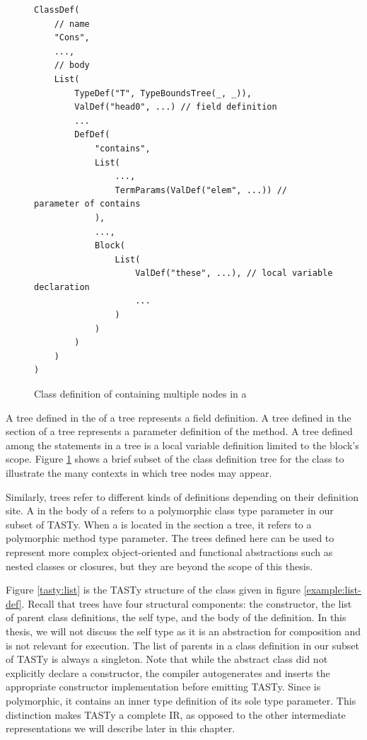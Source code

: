 \begin{figure}[!htb]
\begin{verbatim}
ClassDef(
	// name 
	"Cons",
	...,
	// body
	List(
		TypeDef("T", TypeBoundsTree(_, _)),
		ValDef("head0", ...) // field definition
		...
		DefDef(
			"contains",
			List(
				...,
				TermParams(ValDef("elem", ...)) // parameter of contains
			),
			...,
			Block(
				List(
					ValDef("these", ...), // local variable declaration		
					...
				)
			)
		)
	)
)
\end{verbatim} 
\caption{Class definition of  containing multiple  nodes in a }
\label{example:many-valdefs}
\end{figure}

A  tree defined in the  of a  tree represents a field definition.
A  tree defined in the  section of a  tree represents a parameter definition of the method.
A  tree defined among the statements in a  tree is a local variable definition limited to the block's scope.
Figure \ref{example:many-valdefs} shows a brief subset of the class definition tree for the  class to illustrate the many contexts in which  tree nodes may appear.

Similarly,  trees refer to different kinds of definitions depending on their definition site.
A  in the body of a  refers to a polymorphic class type parameter in our subset of TASTy.
When a  is located in the  section a  tree, it refers to a polymorphic method type parameter.
The trees defined here can be used to represent more complex object-oriented and functional abstractions such as nested classes or closures, but they are beyond the scope of this thesis.

Figure \ref{tasty:list} is the TASTy structure of the  class given in figure \ref{example:list-def}. 
Recall that  trees have four structural components: the constructor, the list of parent class definitions, the self type, and the body of the definition.
In this thesis, we will not discuss the self type as it is an abstraction for composition\cite{gilad:mixins,scala:calculus} and is not relevant for execution.
The list of parents in a class definition in our subset of TASTy is always a singleton.
Note that while the abstract  class did not explicitly declare a constructor, the compiler autogenerates and inserts the appropriate constructor implementation before emitting TASTy.
Since  is polymorphic, it contains an inner type definition of its sole type parameter.
This distinction makes TASTy a complete IR, as opposed to the other intermediate representations we will describe later in this chapter.

